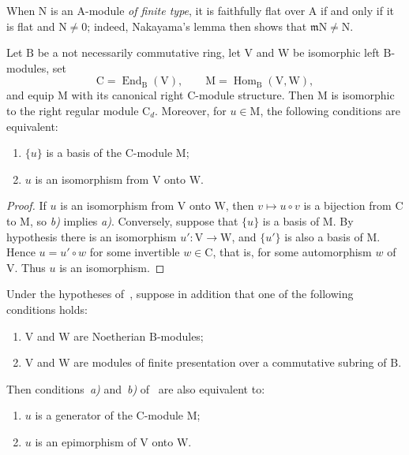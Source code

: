 \begin{remark}[2.5.5.4]
\label{IV.2.5.5.4}
When $\mathrm{N}$ is an $\mathrm{A}$-module \emph{of finite type}, it is
faithfully flat over $\mathrm{A}$ if and only if it is flat and
$\mathrm{N}\neq0$; indeed, Nakayama's lemma then shows that
$\mathfrak{m}\mathrm{N}\neq\mathrm{N}$.
\end{remark}

\begin{lemma}[2.5.6]
\label{IV.2.5.6}
Let $\mathrm{B}$ be a not necessarily commutative ring, let $\mathrm{V}$
and $\mathrm{W}$ be isomorphic left $\mathrm{B}$-modules, set
\[
  \mathrm{C}=\operatorname{End}_{\mathrm{B}}(\mathrm{V}),\qquad
  \mathrm{M}=\operatorname{Hom}_{\mathrm{B}}(\mathrm{V},\mathrm{W}),
\]
and equip $\mathrm{M}$ with its canonical right
$\mathrm{C}$-module structure. Then $\mathrm{M}$ is isomorphic to the
right regular module $\mathrm{C}_d$. Moreover, for $u\in\mathrm{M}$,
the following conditions are equivalent:
\begin{enumerate}
  \item[\emph{a)}] $\{u\}$ is a basis of the $\mathrm{C}$-module
  $\mathrm{M}$;
  \item[\emph{b)}] $u$ is an isomorphism from $\mathrm{V}$ onto
  $\mathrm{W}$.
\end{enumerate}
\end{lemma}

\begin{proof}
If $u$ is an isomorphism from $\mathrm{V}$ onto $\mathrm{W}$, then
$v\mapsto u\circ v$ is a bijection from $\mathrm{C}$ to $\mathrm{M}$,
so \emph{b)} implies \emph{a)}. Conversely, suppose that $\{u\}$ is a
basis of $\mathrm{M}$. By hypothesis there is an isomorphism
$u':\mathrm{V}\to\mathrm{W}$, and $\{u'\}$ is also a basis of
$\mathrm{M}$. Hence $u=u'\circ w$ for some invertible $w\in\mathrm{C}$,
that is, for some automorphism $w$ of $\mathrm{V}$. Thus $u$ is an
isomorphism.
\end{proof}

\begin{corollary}[2.5.7]
\label{IV.2.5.7}
Under the hypotheses of~, suppose in addition that one of
the following conditions holds:
\begin{enumerate}
  \item[(i)] $\mathrm{V}$ and $\mathrm{W}$ are Noetherian
  $\mathrm{B}$-modules;
  \item[(ii)] $\mathrm{V}$ and $\mathrm{W}$ are modules of finite
  presentation over a commutative subring of $\mathrm{B}$.
\end{enumerate}
Then conditions~\emph{a)} and~\emph{b)} of~ are also
equivalent to:
\begin{enumerate}
  \item[\emph{a}$'$)] $u$ is a generator of the $\mathrm{C}$-module
  $\mathrm{M}$;
  \item[\emph{b}$'$)] $u$ is an epimorphism of $\mathrm{V}$ onto $\mathrm{W}$.
\end{enumerate}
\end{corollary}

